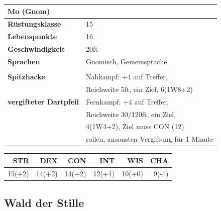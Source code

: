 \documentclass[11pt, twoside]{article}
\begin{document}
\begin{center}
\begin{tabular}{ll}
\textbf{Mo (Gnom)} & \label{table:me1stats}\\[0pt]
\hline
\textbf{Rüstungsklasse} & 15\\[0pt]
\textbf{Lebenspunkte} & 16\\[0pt]
\textbf{Geschwindigkeit} & 20ft\\[0pt]
\textbf{Sprachen} & Gnomisch, Gemeinsprache\\[0pt]
 & \\[0pt]
\textbf{Spitzhacke} & Nahkampf: +4 auf Treffer,\\[0pt]
 & Reichweite 5ft, ein Ziel, 6(1W8+2)\\[0pt]
\textbf{vergifteter Dartpfeil} & Fernkampf: +4 auf Treffer,\\[0pt]
 & Reichweite 30/120ft, ein Ziel,\\[0pt]
 & 4(1W4+2), Ziel muss CON (12)\\[0pt]
 & rollen, ansonsten Vergiftung für 1 Minute\\[0pt]
\end{tabular}
\end{center}

\begin{center}
\begin{tabular}{rrrrrr}
\textbf{STR} & \textbf{DEX} & \textbf{CON} & \textbf{INT} & \textbf{WIS} & \textbf{CHA}\\[0pt]
\hline
15(+2) & 14(+2) & 14(+2) & 12(+1) & 10(+0) & 9(-1)\\[0pt]
\end{tabular}
\end{center}

\newpage

\subsection{Wald der Stille}
\label{sec:org92264a2}
\end{document}
